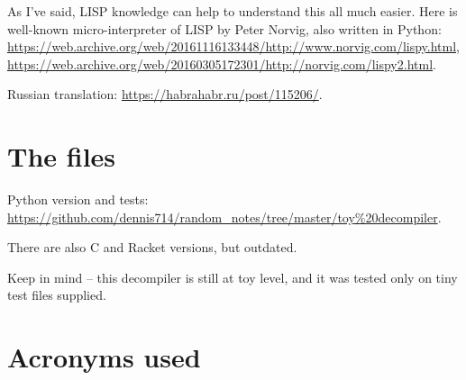 ﻿\documentclass[12pt]{article}
\begin{document}
As I've said, LISP knowledge can help to understand this all much easier.
Here is well-known micro-interpreter of LISP by Peter Norvig, also written in Python:
\url{https://web.archive.org/web/20161116133448/http://www.norvig.com/lispy.html},
\url{https://web.archive.org/web/20160305172301/http://norvig.com/lispy2.html}.

Russian translation: \url{https://habrahabr.ru/post/115206/}.

\section{The files}

Python version and tests:
\url{https://github.com/dennis714/random_notes/tree/master/toy\%20decompiler}.

There are also C and Racket versions, but outdated.

Keep in mind -- this decompiler is still at toy level, and it was tested only on tiny test files supplied.

\section{Acronyms used}

\begin{acronym}
\end{acronym}
\end{document}
